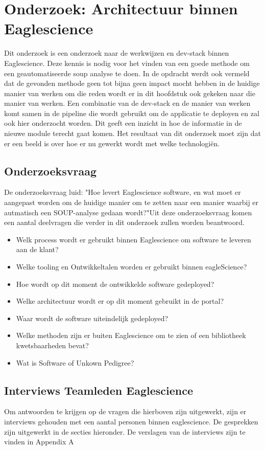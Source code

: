 \chapter{Onderzoek: Architectuur binnen Eaglescience}\label{ch:onderzoek:-architectuur-binnen-eaglescience} %
Dit onderzoek is een onderzoek naar de werkwijzen en dev-stack binnen Eaglescience.
Deze kennis is nodig voor het vinden van een goede methode om een geautomatiseerde soup analyse te doen.
In de opdracht werdt ook vermeld dat de gevonden methode geen tot bijna geen impact mocht hebben in de huidige manier van werken om die reden wordt er in dit hoofdstuk ook gekeken naar die manier van werken.
Een combinatie van de dev-stack en de manier van werken komt samen in de pipeline die wordt gebruikt om de applicatie te deployen en zal ook hier onderzocht worden.
Dit geeft een inzicht in hoe de informatie in de nieuwe module terecht gaat komen.
Het resultaat van dit onderzoek moet zijn dat er een beeld is over hoe er nu gewerkt wordt met welke technologiën.

\section{Onderzoeksvraag}\label{sec:onderzoeksvraag}
De onderzoeksvraag luid: "Hoe levert Eaglescience software, en wat moet er aangepast worden om de huidige manier om te zetten naar een manier waarbij er autmatisch een SOUP-analyse gedaan wordt?"\@ Uit deze onderzoeksvraag komen een aantal deelvragen die verder in dit onderzoek zullen worden beantwoord.

\begin{itemize}
  \item Welk process wordt er gebruikt binnen Eaglescience om software te leveren aan de klant?
  \item Welke tooling en Ontwikkeltalen worden er gebruikt binnen eagleScience?
  \item Hoe wordt op dit moment de ontwikkelde software gedeployed?
  \item Welke architectuur wordt er op dit moment gebruikt in de portal?
  \item Waar wordt de software uiteindelijk gedeployed?
  \item Welke methoden zijn er buiten Eaglescience om te zien of een bibliotheek kwetsbaarheden bevat?
  \item Wat is Software of Unkown Pedigree?
\end{itemize}

\section{Interviews Teamleden Eaglescience}\label{sec:interviews-teamleden-eaglescience}
Om antwoorden te krijgen op de vragen die hierboven zijn uitgewerkt, zijn er interviews gehouden met een aantal personen binnen eaglescience.
De gesprekken zijn uitgewerkt in de secties hieronder.
De verslagen van de interviews zijn te vinden in Appendix A

